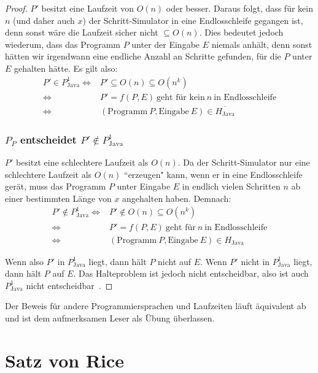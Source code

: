 \documentclass[journal]{IEEEtran}
\begin{document}
\begin{proof}
$P'$ besitzt eine Laufzeit von $O(n)$ oder besser. Daraus folgt, dass für kein $n$ (und daher auch $x$) der Schritt-Simulator in eine Endlosschleife gegangen ist, denn sonst wäre die Laufzeit sicher nicht $\subseteq O(n)$. Dies bedeutet jedoch wiederum, dass das Programm $P$ unter der Eingabe $E$ niemals anhält, denn sonst hätten wir irgendwann eine endliche Anzahl an Schritte gefunden, für die $P$ unter $E$ gehalten hätte. Es gilt also:
\begin{align*}
P' \in P_\text{Java}^1
\Leftrightarrow& P' \subseteq O(n) \subseteq O(n^k) \\
\Leftrightarrow& P' = f(P, E) \ \text{geht f\"ur kein} \  n \ \text{in Endlosschleife} \\
\Leftrightarrow& (\text{Programm} \ P, \text{Eingabe} \ E) \in \overline{H_\text{Java}}
\end{align*}

\subsubsection{$P_P$ entscheidet $P' \notin P_\text{Java}^1$}

$P'$ besitzt eine schlechtere Laufzeit als $O(n)$. Da der Schritt-Simulator nur eine schlechtere Laufzeit als $O(n)$ ``erzeugen" kann, wenn er in eine Endlosschleife gerät, muss das Programm $P$ unter Eingabe $E$ in endlich vielen Schritten $n$ ab einer bestimmten Länge von $x$ angehalten haben. Demnach:
\begin{align*}
P' \notin P_\text{Java}^1
\Leftrightarrow& P' \notin O(n) \subseteq O(n^k) \\
\Leftrightarrow& P' = f(P, E) \ \text{geht f\"ur} \  n \ \text{in Endlosschleife} \\
\Leftrightarrow& (\text{Programm} \ P, \text{Eingabe} \ E) \in H_\text{Java}
\end{align*}

Wenn also $P'$ in $P_\text{Java}^1$ liegt, dann hält $P$ nicht auf $E$. Wenn $P'$ nicht in $P_\text{Java}^1$ liegt, dann hält $P$ auf $E$. Das Halteproblem ist jedoch nicht entscheidbar, also ist auch $P_\text{Java}^1$ nicht entscheidbar~\cite{entscheidbarkeitovonn}.

\end{proof}

Der Beweis für andere Programmiersprachen und Laufzeiten läuft äquivalent ab und ist dem aufmerksamen Leser als Übung überlassen.

\section{Satz von Rice}
\label{satzvonrice}
\end{document}
